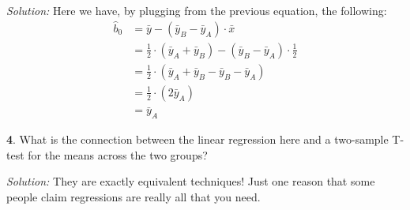 \documentclass{tufte-handout}
\begin{document}
\textit{Solution:} Here we have, by plugging from the previous equation, the following:
\begin{align*}
\widehat{b}_0 &= \bar{y} - (\bar{y}_B - \bar{y}_A) \cdot \bar{x} \\
&= \frac{1}{2} \cdot (\bar{y}_A + \bar{y}_B) - (\bar{y}_B - \bar{y}_A) \cdot \frac{1}{2} \\
&= \frac{1}{2} \cdot (\bar{y}_A + \bar{y}_B - \bar{y}_B - \bar{y}_A) \\
&= \frac{1}{2} \cdot (2 \bar{y}_A) \\
&= \bar{y}_A
\end{align*}

\textbf{4}. What is the connection between the linear regression here and a two-sample T-test
for the means across the two groups?

\textit{Solution:} They are exactly equivalent techniques! Just one reason that some people claim
regressions are really all that you need.
\end{document}
